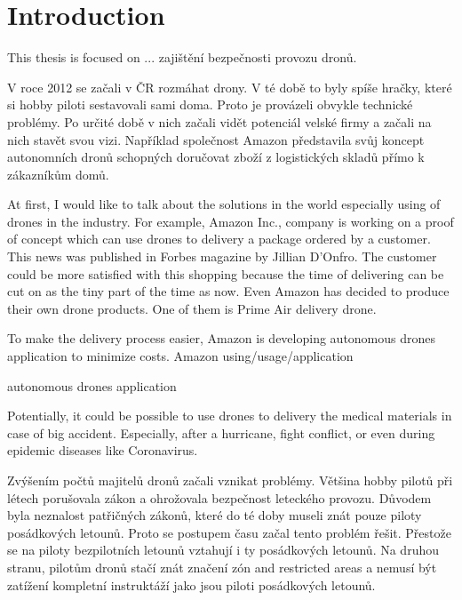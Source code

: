 \chapter{Introduction}\label{ch:introduction}
This thesis is focused on ... zajištění bezpečnosti provozu dronů.


V roce 2012 se začali v ČR rozmáhat drony.
V té době to byly spíše hračky, které si hobby piloti sestavovali sami doma.
Proto je provázeli obvykle technické problémy.
Po určité době v nich začali vidět potenciál velské firmy a začali na nich stavět svou vizi.
Například společnost Amazon představila svůj koncept autonomních dronů schopných doručovat zboží z logistických skladů přímo k zákazníkům domů.

At first, I would like to talk about the solutions in the world especially using of drones in the industry.
For example, Amazon Inc., company is working on a proof of concept which can use drones to delivery a package ordered by a customer.
This news was published in Forbes magazine by Jillian D'Onfro.\cite{amazonArticle}
The customer could be more satisfied with this shopping because the time of delivering can be cut on as the tiny part of the time as now.
Even Amazon has decided to produce their own drone products.
One of them is Prime Air delivery drone.

To make the delivery process easier, Amazon is developing autonomous drones application to minimize costs.
Amazon using/usage/application

autonomous drones application

Potentially, it could be possible to use drones to delivery the medical materials in case of big accident.
Especially, after a hurricane, fight conflict, or even during epidemic diseases like Coronavirus.

Zvýšením počtů majitelů dronů začali vznikat problémy.
Většina hobby pilotů při létech porušovala zákon a ohrožovala bezpečnost leteckého provozu.
Důvodem byla neznalost patřičných zákonů, které do té doby museli znát pouze piloty posádkových letounů.
Proto se postupem času začal tento problém řešit.
Přestože se na piloty bezpilotních letounů vztahují i ty posádkových letounů.
Na druhou stranu, pilotům dronů stačí znát značení zón and restricted areas a nemusí být zatížení kompletní instruktáží jako jsou piloti posádkových letounů.

